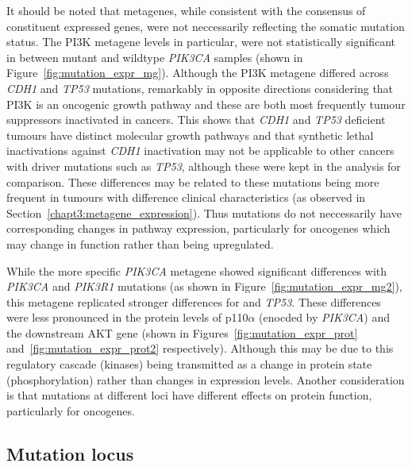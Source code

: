 It should be noted that metagenes, while consistent with the consensus of constituent expressed genes, were not neccessarily reflecting the somatic mutation status. The PI3K \citep{Gatza2011} metagene levels in particular, were not statistically significant in between mutant and wildtype \textit{PIK3CA} samples (shown in Figure~\ref{fig:mutation_expr_mg}). Although the PI3K metagene differed across \textit{CDH1} and \textit{TP53} mutations, remarkably in opposite directions considering that PI3K is an oncogenic growth pathway and these are both most frequently tumour suppressors inactivated in cancers. This shows that \textit{CDH1} and \textit{TP53} deficient tumours have distinct molecular growth pathways and that synthetic lethal inactivations against \textit{CDH1} inactivation may not be applicable to other cancers with driver mutations such as \textit{TP53}, although these were kept in the analysis for comparison. These differences may be related to these mutations being more frequent in tumours with difference clinical characteristics (as observed in Section~\ref{chapt3:metagene_expression}).  Thus mutations do not neccessarily have corresponding changes in pathway expression, particularly for oncogenes which may change in function rather than being upregulated.


While the more specific \textit{PIK3CA} \citep{Gatza2014} metagene showed significant differences with \textit{PIK3CA} and \textit{PIK3R1} mutations (as shown in Figure~\ref{fig:mutation_expr_mg2}), this metagene replicated stronger differences for  and \textit{TP53}.  These differences were less pronounced in the protein levels of p110$\alpha$ (enocded by \textit{PIK3CA}) and the downstream AKT gene (shown in Figures~\ref{fig:mutation_expr_prot} and~\ref{fig:mutation_expr_prot2} respectively). Although this may be due to this regulatory cascade (kinases) being transmitted as a change in protein state (phosphorylation) rather than changes in expression levels. Another consideration is that mutations at different loci have different effects on protein function, particularly for oncogenes.

\FloatBarrier

\subsection{Mutation locus}  \label{chapt3:metagene_mut_locus}

